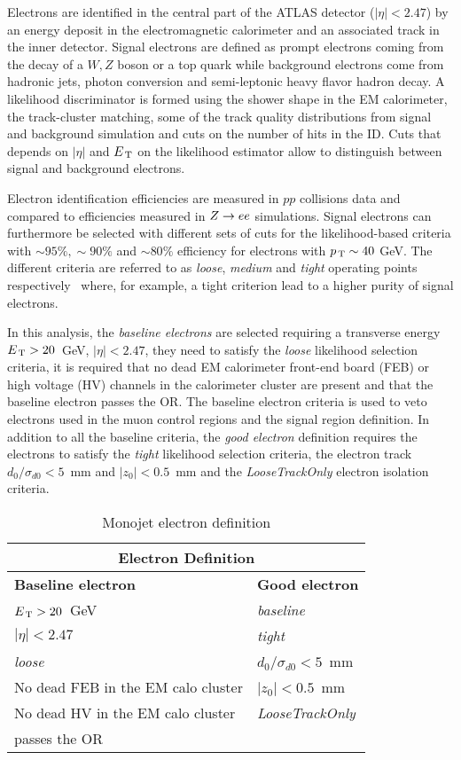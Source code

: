 Electrons are identified in the central part of the ATLAS detector
($|\eta| < 2.47$) by an energy deposit in the electromagnetic calorimeter and an
associated track in the inner detector. Signal electrons are defined as prompt
electrons coming from the decay of a $W, Z$ boson or a top quark while
background electrons come from hadronic jets, photon conversion and
semi-leptonic heavy flavor hadron decay. A likelihood discriminator is formed
using the shower shape in the EM calorimeter, the track-cluster matching, some
of the track quality distributions from signal and background simulation and
cuts on the number of hits in the ID. Cuts that depends on $|\eta|$ and $E_\mathrm{\, T}$ on
the likelihood estimator allow to distinguish between signal and background
electrons.

Electron identification efficiencies are measured in $pp$ collisions data and
compared to efficiencies measured in $Z \to e e$ simulations. Signal electrons can
furthermore be selected with different sets of cuts for the likelihood-based
criteria with $\sim 95\%, \sim 90\%$ and $\sim 80\%$ efficiency for electrons
with $p_\mathrm{\, T} \sim 40~$GeV. The different criteria are referred to as \emph{loose},
\emph{medium} and \emph{tight} operating points respectively~\cite{ATL-EL-IDENT}
where, for example, a tight criterion lead to a higher purity of signal
electrons.

In this analysis, the \emph{baseline electrons} are selected requiring a
transverse energy $E_\mathrm{\, T} > 20$~GeV, $|\eta| < 2.47$, they need to satisfy the
\emph{loose} likelihood selection criteria, it is required that no dead EM
calorimeter front-end board (FEB) or high voltage (HV) channels in the
calorimeter cluster are present and that the baseline electron passes the
OR. The baseline electron criteria is used to veto electrons used in the muon
control regions and the signal region definition. In addition to all the
baseline criteria, the \emph{good electron} definition requires the electrons to
satisfy the \emph{tight} likelihood selection criteria, the electron track
$d_0 / \sigma_{d0} < 5$~mm and $|z_0| < 0.5$~mm and the \emph{LooseTrackOnly}
electron isolation criteria.

\begin{table}[!th]
  \centering
  \begin{tabular}{ll}
    \toprule
    \multicolumn{2}{c}{Electron Definition} \\
    \midrule \midrule
    \textbf{Baseline electron} & \textbf{Good electron} \\
    \midrule
    $E_\mathrm{\, T} > 20$~GeV & \emph{baseline} \\
    $|\eta| < 2.47$ & \emph{tight} \\
    \emph{loose} & $d_0 / \sigma_{d0} < 5$~mm \\
    No dead FEB in the EM calo cluster & $|z_0| < 0.5$~mm \\
    No dead HV in the EM calo cluster & \emph{LooseTrackOnly} \\
    passes the OR & \\
    \bottomrule
  \end{tabular}
  \caption{Monojet electron definition}
  \label{tab:ele_def}
\end{table}
